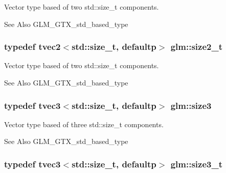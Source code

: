 Vector type based of two std\-::size\-\_\-t components. \begin{DoxySeeAlso}{See Also}
G\-L\-M\-\_\-\-G\-T\-X\-\_\-std\-\_\-based\-\_\-type 
\end{DoxySeeAlso}
\hypertarget{group__gtx__std__based__type_ga47b1e2bca519b02eb8500a240216b5de}{
\subsubsection[{size2\-\_\-t}]{\setlength{\rightskip}{0pt plus 5cm}typedef tvec2$<$std\-::size\-\_\-t, defaultp$>$ {\bf glm\-::size2\-\_\-t}}}\label{group__gtx__std__based__type_ga47b1e2bca519b02eb8500a240216b5de}
Vector type based of two std\-::size\-\_\-t components. \begin{DoxySeeAlso}{See Also}
G\-L\-M\-\_\-\-G\-T\-X\-\_\-std\-\_\-based\-\_\-type 
\end{DoxySeeAlso}
\hypertarget{group__gtx__std__based__type_gacf3e47fc09ad812f100e13442919fc79}{
\subsubsection[{size3}]{\setlength{\rightskip}{0pt plus 5cm}typedef tvec3$<$std\-::size\-\_\-t, defaultp$>$ {\bf glm\-::size3}}}\label{group__gtx__std__based__type_gacf3e47fc09ad812f100e13442919fc79}
Vector type based of three std\-::size\-\_\-t components. \begin{DoxySeeAlso}{See Also}
G\-L\-M\-\_\-\-G\-T\-X\-\_\-std\-\_\-based\-\_\-type 
\end{DoxySeeAlso}
\hypertarget{group__gtx__std__based__type_ga689991bc66c16637f043ade5cbb87260}{
\subsubsection[{size3\-\_\-t}]{\setlength{\rightskip}{0pt plus 5cm}typedef tvec3$<$std\-::size\-\_\-t, defaultp$>$ {\bf glm\-::size3\-\_\-t}}}\label{group__gtx__std__based__type_ga689991bc66c16637f043ade5cbb87260}
